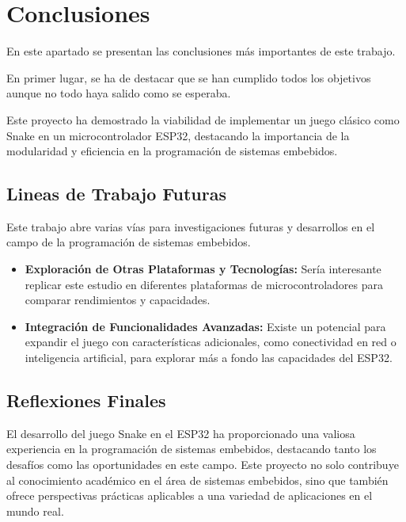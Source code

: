 \section{Conclusiones}

En este apartado se presentan las conclusiones m\'as importantes de este trabajo. 

En primer lugar, se ha de destacar que se han cumplido todos los objetivos aunque no todo haya salido como se esperaba.

Este proyecto ha demostrado la viabilidad de implementar un juego clásico como Snake en un microcontrolador ESP32, destacando la importancia de la modularidad y eficiencia en la programación de sistemas embebidos.

\subsection{Lineas de Trabajo Futuras}

Este trabajo abre varias vías para investigaciones futuras y desarrollos en el campo de la programación de sistemas embebidos.

\begin{itemize}
    \item \textbf{Exploración de Otras Plataformas y Tecnologías:} Sería interesante replicar este estudio en diferentes plataformas de microcontroladores para comparar rendimientos y capacidades.
    \item \textbf{Integración de Funcionalidades Avanzadas:} Existe un potencial para expandir el juego con características adicionales, como conectividad en red o inteligencia artificial, para explorar más a fondo las capacidades del ESP32.
\end{itemize}

\subsection{Reflexiones Finales}

El desarrollo del juego Snake en el ESP32 ha proporcionado una valiosa experiencia en la programación de sistemas embebidos, destacando tanto los desafíos como las oportunidades en este campo. Este proyecto no solo contribuye al conocimiento académico en el área de sistemas embebidos, sino que también ofrece perspectivas prácticas aplicables a una variedad de aplicaciones en el mundo real.